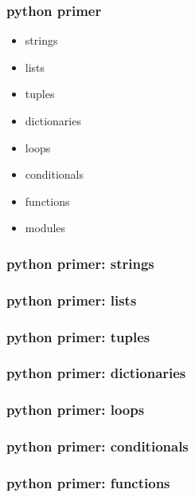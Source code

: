 \begin{frame} \frametitle{python primer}

\begin{itemize}
   \item strings
   \item lists
   \item tuples
   \item dictionaries
   \item loops
   \item conditionals
   \item functions 
   \item modules
\end{itemize}

\end{frame}
\cwpnote{}

\begin{frame} \frametitle{python primer: strings}
\end{frame}

\begin{frame} \frametitle{python primer: lists}
\end{frame}

\begin{frame} \frametitle{python primer: tuples}
\end{frame}

\begin{frame} \frametitle{python primer: dictionaries}
\end{frame}

\begin{frame} \frametitle{python primer: loops}
\end{frame}

\begin{frame} \frametitle{python primer: conditionals}
\end{frame}

\begin{frame} \frametitle{python primer: functions}
\end{frame}

